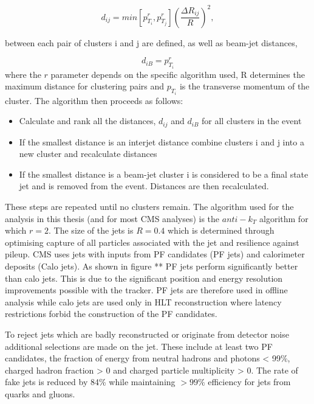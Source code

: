 \begin{equation}
d_{ij} = min\left[p^r_{T_i},p^r_{T_j}\right]\left(\frac{\Delta R_{ij}}{R}\right)^2,
\end{equation}

between each pair of clusters i and j are defined, as well as beam-jet distances, 

\begin{equation}
d_{iB} = p^r_{T_i}
\end{equation}
where the $r$ parameter depends on the specific algorithm used, R determines the maximum distance
for clustering pairs and $p_{T_i}$ is the transverse momentum of the cluster. The algorithm then proceeds
as follows:
\begin{itemize}
\item Calculate and rank all the distances, $d_{ij}$ and $d_{iB}$ for all clusters in the event
\item If the smallest distance is an interjet distance combine clusters i and j into a new cluster and recalculate distances
\item If the smallest distance is a beam-jet cluster i is considered to be a final state jet and is removed from the event. Distances 
are then recalculated.
\end{itemize}

These steps are repeated until no clusters remain. The algorithm used for the analysis in this thesis (and for most CMS analyses) is 
the $anti-k_T$ algorithm for which $r=2$. The size of the jets is $R=0.4$ which is determined through optimising capture of all particles
associated with the jet and resilience against pileup. CMS uses jets with inputs from PF candidates (PF jets) and calorimeter deposits (Calo jets).
As shown in figure ** PF jets perform significantly better than calo jets. This is due to the significant position and energy resolution 
improvements possible with the tracker. PF jets are therefore used in offline analysis while calo jets are used only in HLT reconstruction
where latency restrictions forbid the construction of the PF candidates. 

To reject jets which are badly reconstructed or originate from detector noise additional selections are made on the jet. These include at least
two PF candidates, the fraction of energy from neutral hadrons and photons < 99\%,  charged hadron fraction > 0 and charged particle multiplicity > 0.
The rate of fake jets is reduced by 84\% while maintaining $> 99\%$ efficiency for jets from quarks and gluons.

